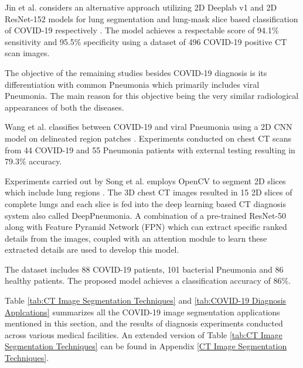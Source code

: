 Jin et al. considers an alternative approach  
utilizing 2D Deeplab v1 and 2D ResNet-152 models for lung segmentation 
and lung-mask slice based classification of COVID-19 respectively \cite{JCW+2020}. The 
model achieves a respectable score of 94.1\% sensitivity and 95.5\% 
specificity using a dataset of 496 COVID-19 positive CT scan images.

The objective of the remaining studies besides COVID-19 diagnosis is its differentiation
with common Pneumonia which primarily 
includes viral Pneumonia. The main reason for this objective being the 
very similar radiological appearances of both the diseases.

Wang et al. classifies between COVID-19 and viral Pneumonia using a 2D CNN model on delineated 
region patches \cite{WBX+2020}. Experiments conducted on chest CT scans from 
44 COVID-19 and 55 Pneumonia patients with external testing 
resulting in 79.3\% accuracy.

Experiments carried out by Song et al. employs OpenCV to segment 
2D slices which include lung regions \cite{SZL+2020}. The 3D chest CT images resulted in 
15 2D slices of complete lungs and each slice is fed into the deep learning based CT diagnosis system also called DeepPneumonia. A combination of 
a pre-trained ResNet-50 along with Feature Pyramid Network (FPN) which can 
extract specific ranked details from the images, coupled 
with an attention module to learn these extracted details are used to develop this model.

The dataset includes 88 COVID-19 patients, 101 bacterial Pneumonia and 86 
healthy patients. The proposed model achieves a classification accuracy of 86\%.

Table \ref{tab:CT Image Segmentation Techniques} and \ref{tab:COVID-19 Diagnosis Applcations} summarizes all the COVID-19 image segmentation 
applications mentioned in this section,
and the results of diagnosis experiments conducted across various 
medical facilities. An extended version of Table \ref{tab:CT Image Segmentation Techniques} can be found in Appendix \ref{CT Image Segmentation Techniques}.
\vspace{1em}

